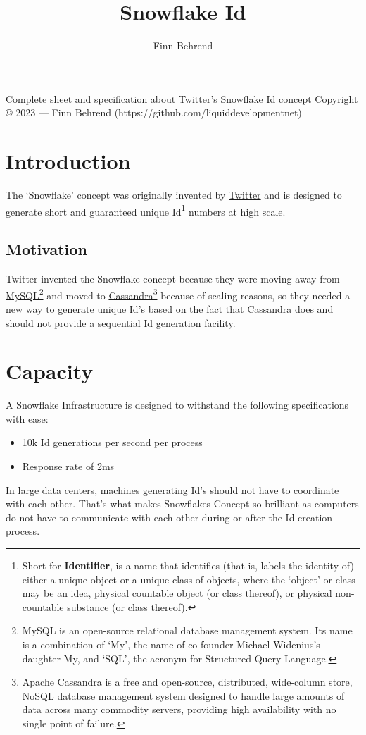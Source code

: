 \documentclass{article}
\title{\textbf{Snowflake Id}}
\author{Finn Behrend}
\begin{document}
\begin{titlingpage}
	\maketitle
	\begin{center}
		\vspace{50px}
		Complete sheet and specification about Twitter's Snowflake Id
		concept
		\vfill
		\footnotesize{Copyright \copyright{} 2023 --- Finn Behrend
			(https://github.com/liquiddevelopmentnet)}
	\end{center}
\end{titlingpage}

\tableofcontents

\pagebreak

\section{Introduction}
The `Snowflake' concept was originally invented by
\href{https://twitter.com}{Twitter} and is designed to generate short and
guaranteed unique Id\footnote{Short for \textbf{Identifier},  is a name
	that
	identifies (that is, labels the identity of) either a unique object or
	a
	unique
	class of objects, where the `object' or class may be an idea, physical
	countable object (or class thereof), or physical non-countable
	substance
	(or
	class thereof).} numbers at high scale.

\subsection{Motivation}
Twitter invented the Snowflake concept because they were moving away from
\href{https://en.wikipedia.org/wiki/MySQL}{MySQL}\footnote{MySQL is an
	open-source relational database management system. Its name is a
	combination of
	`My', the name of co-founder Michael Widenius's daughter My, and `SQL',
	the
	acronym for Structured Query Language.} and moved to
\href{https://en.wikipedia.org/wiki/Cassandra}{Cassandra}\footnote{Apache
	Cassandra is
	a free and open-source, distributed, wide-column store, NoSQL database
	management system designed to handle large amounts of data across many
	commodity servers, providing high availability with no single point of
	failure.} because of scaling
reasons, so they needed a new way to generate unique Id's based on the fact
that Cassandra does and should not provide a sequential Id generation facility.

\section{Capacity}
A Snowflake Infrastructure is designed to withstand the following specifications with ease:
\begin{itemize}
	\item 10k Id generations per second per process
	\item Response rate of 2ms
\end{itemize}
In large data centers, machines generating Id's should not have to coordinate
with each other. That's what makes Snowflakes Concept so brilliant as computers
do not have to communicate with each other during or after the Id creation
process.
\end{document}
